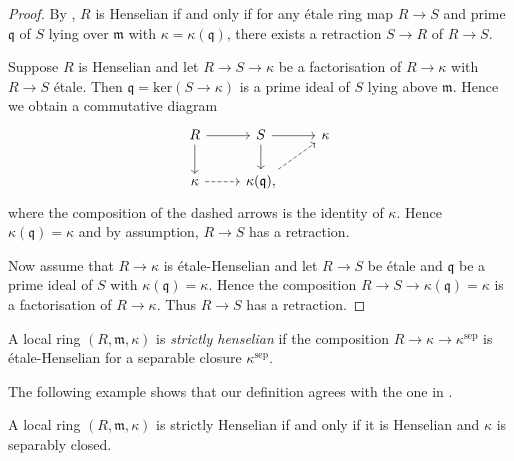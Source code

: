 \begin{proof}
    By {\cite[\href{https://stacks.math.columbia.edu/tag/04GG}{Tag 04GG}]{stacks-project}}, $R$ is Henselian if and only if
    for any étale ring map $R \to S$ and prime $\mathfrak{q}$ of $S$ lying over $\mathfrak{m}$ with $\kappa = \kappa(\mathfrak{q})$,
    there exists a retraction $S \to R$ of $R \to S$.

    Suppose $R$ is Henselian and let $R \to S \to \kappa$ be a factorisation of $R \to \kappa$ with $R \to S$ étale. Then
    $\mathfrak{q} = \mathrm{ker}(S \to \kappa)$ is a prime ideal of $S$ lying above $\mathfrak{m}$. Hence we obtain a commutative
    diagram
    \[
        \begin{tikzcd}
        R \arrow{r} \arrow{d} & S \arrow{r} \arrow{d} & \kappa \\
        \kappa \arrow[dashed]{r} & \kappa(\mathfrak{q}) \arrow[dashed]{ur},
        \end{tikzcd}
    \] where the composition of the dashed arrows is the identity of $\kappa$. Hence $\kappa(\mathfrak{q}) = \kappa$ and by assumption,
    $R \to S$ has a retraction.

    Now assume that $R \to \kappa$ is étale-Henselian and let $R \to S$ be étale and $\mathfrak{q}$ be a prime ideal of $S$ with
    $\kappa(\mathfrak{q}) = \kappa$. Hence the composition $R \to S \to \kappa(\mathfrak{q}) = \kappa$ is a factorisation
    of $R \to \kappa$. Thus $R \to S$ has a retraction.
\end{proof}


\begin{definition}
    \label{def:strictly-henselian-local-ring}
    A local ring $(R, \mathfrak{m}, \kappa)$ is \emph{strictly henselian} if the composition $R \to \kappa \to \kappa^{\mathrm{sep}}$ is étale-Henselian
    for a separable closure $\kappa^{\mathrm{sep}}$.
\end{definition}

The following example shows that our definition agrees with the one in
\cite[\href{https://stacks.math.columbia.edu/tag/04GF}{Tag 04GF}]{stacks-project}.

\begin{lemma}
    \label{lem:sh-iff-henselian-and-sep-closed}
    A local ring $(R, \mathfrak{m}, \kappa)$ is strictly Henselian if and only if it is Henselian and $\kappa$ is separably closed.
    \leanok
\end{lemma}


